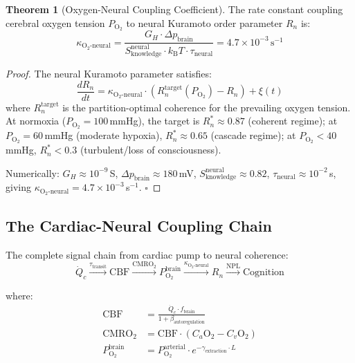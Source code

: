\documentclass[12pt,a4paper]{article}
\theoremstyle{definition}
\newtheorem{theorem}{Theorem}
\newcommand{\SK}{S_{\text{knowledge}}}
\newcommand{\kBT}{k_{\text{B}}T}
\begin{document}
\begin{theorem}[Oxygen-Neural Coupling Coefficient]
The rate constant coupling cerebral oxygen tension $P_{\text{O}_2}$ to
neural Kuramoto order parameter $R_n$ is:
\begin{equation}
\boxed{\kappa_{\text{O}_2\text{-neural}} = \frac{G_H \cdot \Delta p_{\text{brain}}}{\SK^{\text{neural}} \cdot \kBT \cdot \tau_{\text{neural}}}
= 4.7 \times 10^{-3}\,\text{s}^{-1}}
\end{equation}
\end{theorem}

\begin{proof}
The neural Kuramoto parameter satisfies:
\begin{equation}
\frac{dR_n}{dt} = \kappa_{\text{O}_2\text{-neural}} \cdot \left(R_n^{\text{target}}(P_{\text{O}_2}) - R_n\right)
+ \xi(t)
\end{equation}
where $R_n^{\text{target}}$ is the partition-optimal coherence for the prevailing oxygen
tension. At normoxia ($P_{\text{O}_2} = 100$\,mmHg), the target is $R_n^* \approx 0.87$
(coherent regime); at $P_{\text{O}_2} = 60$\,mmHg (moderate hypoxia), $R_n^* \approx 0.65$
(cascade regime); at $P_{\text{O}_2} < 40$\,mmHg, $R_n^* < 0.3$ (turbulent/loss of consciousness).

Numerically: $G_H \approx 10^{-9}$\,S, $\Delta p_{\text{brain}} \approx 180$\,mV,
$\SK^{\text{neural}} \approx 0.82$, $\tau_{\text{neural}} \approx 10^{-2}$\,s,
giving $\kappa_{\text{O}_2\text{-neural}} = 4.7 \times 10^{-3}$\,s$^{-1}$. $\square$
\end{proof}

\subsection{The Cardiac-Neural Coupling Chain}

The complete signal chain from cardiac pump to neural coherence:
\begin{equation}
\dot{Q}_c \xrightarrow{\tau_{\text{transit}}} \text{CBF}
\xrightarrow{\text{CMRO}_2} P_{\text{O}_2}^{\text{brain}}
\xrightarrow{\kappa_{\text{O}_2\text{-neural}}} R_n
\xrightarrow{\text{NPL}} \text{Cognition}
\end{equation}

where:
\begin{align}
\text{CBF} &= \frac{\dot{Q}_c \cdot f_{\text{brain}}}{1 + \beta_{\text{autoregulation}}}\\
\text{CMRO}_2 &= \text{CBF} \cdot (C_a\text{O}_2 - C_v\text{O}_2)\\
P_{\text{O}_2}^{\text{brain}} &= P_{\text{O}_2}^{\text{arterial}} \cdot e^{-\gamma_{\text{extraction}} \cdot L}
\end{align}
\end{document}
